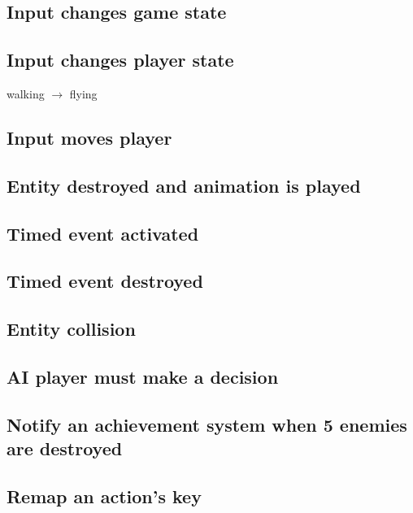 \documentclass[12pt]{article}
\begin{document}
\subsection{Input changes game state}
\subsection{Input changes player state}
walking $\rightarrow$ flying
\subsection{Input moves player}
\subsection{Entity destroyed and animation is played}
\subsection{Timed event activated}
\subsection{Timed event destroyed}
\subsection{Entity collision}
\subsection{AI player must make a decision}
\subsection{Notify an achievement system when 5 enemies are destroyed}
\subsection{Remap an action's key}
\end{document}
